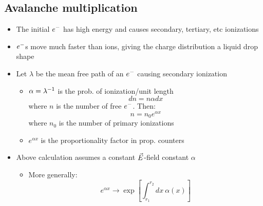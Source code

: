 \subsection{Avalanche multiplication}
\begin{itemize}
  \item The initial $e^{-}$ has high energy and causes secondary, tertiary, etc ionizations
  \item $e^{-}$s move much faster than ions, giving the charge distribution a liquid drop shape
  \item Let $\lambda$ be the mean free path of an $e^{-}$ causing secondary ionization
  \begin{itemize}
    \item $\alpha = \lambda^{-1}$ is the prob. of ionization/unit length
    \begin{equation}
      dn = n\alpha dx
    \end{equation}
    where $n$ is the number of free $e^{-}$. Then:
    \begin{equation}
      n = n_0 e^{\alpha x}
    \end{equation}
    where $n_0$ is the number of primary ionizations
    \item $e^{\alpha x}$ is the proportionality factor in prop. counters
  \end{itemize}
  \item Above calculation assumes a constant $\vec{E}$-field \thus constant $\alpha$
  \begin{itemize}
    \item More generally:
    \begin{equation}
      e^{\alpha x}\rightarrow \exp \left[\int_{r_1}^{r_2} dx~\alpha(x)\right]
    \end{equation}
  \end{itemize}
\end{itemize}

